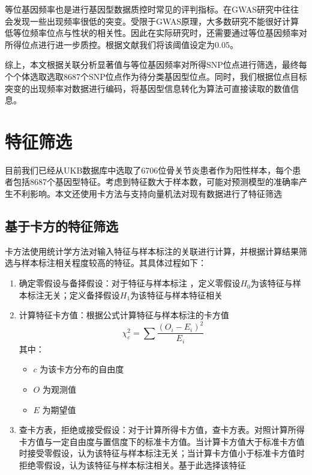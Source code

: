 等位基因频率也是进行基因型数据质控时常见的评判指标。在GWAS研究中往往会发现一些出现频率很低的突变。受限于GWAS原理，大多数研究不能很好计算低等位频率位点与性状的相关性。因此在实际研究时，还需要通过等位基因频率对所得位点进行进一步质控。根据文献我们将该阈值设定为0.05\cite{marees_tutorial_2018}。

综上，本文根据关联分析显著值与等位基因频率对所得SNP位点进行筛选，最终每个个体选取选取8687个SNP位点作为待分类基因型位点。同时，我们根据位点目标突变的出现频率对数据进行编码，将基因型信息转化为算法可直接读取的数值信息。

\section{特征筛选}
目前我们已经从UKB数据库中选取了6706位骨关节炎患者作为阳性样本，每个患者包括8687个基因型特征。考虑到特征数大于样本数，可能对预测模型的准确率产生不利影响。\cite{janes_optimal_2005}本文还使用卡方法与支持向量机法对现有数据进行了特征筛选
\subsection{基于卡方的特征筛选}

卡方法使用统计学方法对输入特征与样本标注的关联进行计算，并根据计算结果筛选与样本标注相关程度较高的特征。其具体过程如下：

\begin{enumerate}
\item
  确定零假设与备择假设：对于特征与样本标注
  ，定义零假设$H_0$为该特征与样本标注无关；定义备择假设$H_1$为该特征与样本特征相关
\item
  计算特征卡方值：根据公式计算特征与样本标注的卡方值
    \begin{equation}
        \chi_c^2=\sum \frac{(O_{i}-E_i)^2}{E_i}
    \end{equation}
  其中：

  \begin{itemize}
  \item
    \(c\) 为该卡方分布的自由度
  \item
    \(O\) 为观测值
  \item
    \(E\) 为期望值
  \end{itemize}
\item
  查卡方表，拒绝或接受假设：对于计算所得卡方值，查卡方表。对照计算所得卡方值与一定自由度与置信度下的标准卡方值。当计算卡方值大于标准卡方值时接受零假设，认为该特征与样本标注无关；当计算卡方值小于标准卡方值时拒绝零假设，认为该特征与样本标注相关。基于此选择该特征
\end{enumerate}
